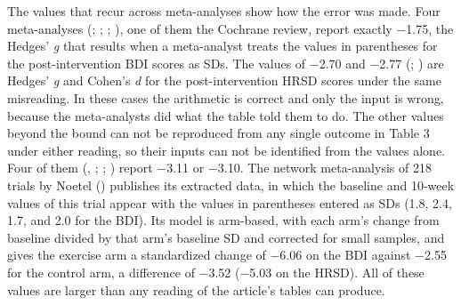 \documentclass[
  letterpaper,
  DIV=11,
  numbers=noendperiod]{scrartcl}
\begin{document}
The values that recur across meta-analyses show how the error was made.
Four meta-analyses (;
;
; ), one of them the Cochrane review, report exactly −1.75, the
Hedges' \emph{g} that results when a meta-analyst treats the values in
parentheses for the post-intervention BDI scores as SDs. The values of
−2.70 and −2.77 (;
) are Hedges' \emph{g} and
Cohen's \emph{d} for the post-intervention HRSD scores under the same
misreading. In these cases the arithmetic is correct and only the input
is wrong, because the meta-analysts did what the table told them to do.
The other values beyond the bound can not be reproduced from any single
outcome in Table 3 under either reading, so their inputs can not be
identified from the values alone. Four of them
(,
; ; ) report −3.11 or −3.10. The
network meta-analysis of 218 trials by Noetel
() publishes its extracted data, in which
the baseline and 10-week values of this trial appear with the values in
parentheses entered as SDs (1.8, 2.4, 1.7, and 2.0 for the BDI). Its
model is arm-based, with each arm's change from baseline divided by that
arm's baseline SD and corrected for small samples, and gives the
exercise arm a standardized change of −6.06 on the BDI against −2.55 for
the control arm, a difference of −3.52 (−5.03 on the HRSD). All of these
values are larger than any reading of the article's tables can produce.
\end{document}
